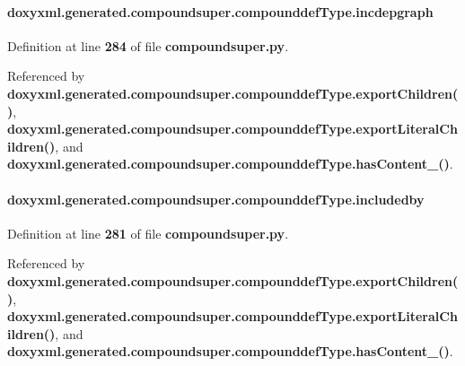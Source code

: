 \paragraph[{incdepgraph}]{\setlength{\rightskip}{0pt plus 5cm}doxyxml.\+generated.\+compoundsuper.\+compounddef\+Type.\+incdepgraph}\label{classdoxyxml_1_1generated_1_1compoundsuper_1_1compounddefType_a9ccd8fb03086ade348c94bf763bffd6e}


Definition at line {\bf 284} of file {\bf compoundsuper.\+py}.



Referenced by {\bf doxyxml.\+generated.\+compoundsuper.\+compounddef\+Type.\+export\+Children()}, {\bf doxyxml.\+generated.\+compoundsuper.\+compounddef\+Type.\+export\+Literal\+Children()}, and {\bf doxyxml.\+generated.\+compoundsuper.\+compounddef\+Type.\+has\+Content\+\_\+()}.

\paragraph[{includedby}]{\setlength{\rightskip}{0pt plus 5cm}doxyxml.\+generated.\+compoundsuper.\+compounddef\+Type.\+includedby}\label{classdoxyxml_1_1generated_1_1compoundsuper_1_1compounddefType_a55824766502a5496c563920a361c0845}


Definition at line {\bf 281} of file {\bf compoundsuper.\+py}.



Referenced by {\bf doxyxml.\+generated.\+compoundsuper.\+compounddef\+Type.\+export\+Children()}, {\bf doxyxml.\+generated.\+compoundsuper.\+compounddef\+Type.\+export\+Literal\+Children()}, and {\bf doxyxml.\+generated.\+compoundsuper.\+compounddef\+Type.\+has\+Content\+\_\+()}.

